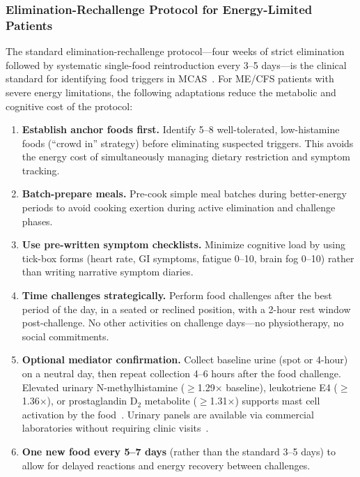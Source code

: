 \subsubsection{Elimination-Rechallenge Protocol for Energy-Limited Patients}
\label{subsubsec:elimination-protocol}

The standard elimination-rechallenge protocol---four weeks of strict elimination followed by systematic single-food reintroduction every 3--5 days---is the clinical standard for identifying food triggers in MCAS~\cite{ComasBaste2020histamine}. For ME/CFS patients with severe energy limitations, the following adaptations reduce the metabolic and cognitive cost of the protocol:

\begin{enumerate}
    \item \textbf{Establish anchor foods first.} Identify 5--8 well-tolerated, low-histamine foods (``crowd in'' strategy) before eliminating suspected triggers. This avoids the energy cost of simultaneously managing dietary restriction and symptom tracking.
    \item \textbf{Batch-prepare meals.} Pre-cook simple meal batches during better-energy periods to avoid cooking exertion during active elimination and challenge phases.
    \item \textbf{Use pre-written symptom checklists.} Minimize cognitive load by using tick-box forms (heart rate, GI symptoms, fatigue 0--10, brain fog 0--10) rather than writing narrative symptom diaries.
    \item \textbf{Time challenges strategically.} Perform food challenges after the best period of the day, in a seated or reclined position, with a 2-hour rest window post-challenge. No other activities on challenge days---no physiotherapy, no social commitments.
    \item \textbf{Optional mediator confirmation.} Collect baseline urine (spot or 4-hour) on a neutral day, then repeat collection 4--6 hours after the food challenge. Elevated urinary N-methylhistamine ($\geq$1.29$\times$ baseline), leukotriene E4 ($\geq$1.36$\times$), or prostaglandin D$_2$ metabolite ($\geq$1.31$\times$) supports mast cell activation by the food~\cite{Voelker2025biomarkersmast}. Urinary panels are available via commercial laboratories without requiring clinic visits~\cite{Voelker2024urinemast}.
    \item \textbf{One new food every 5--7 days} (rather than the standard 3--5 days) to allow for delayed reactions and energy recovery between challenges.
\end{enumerate}

